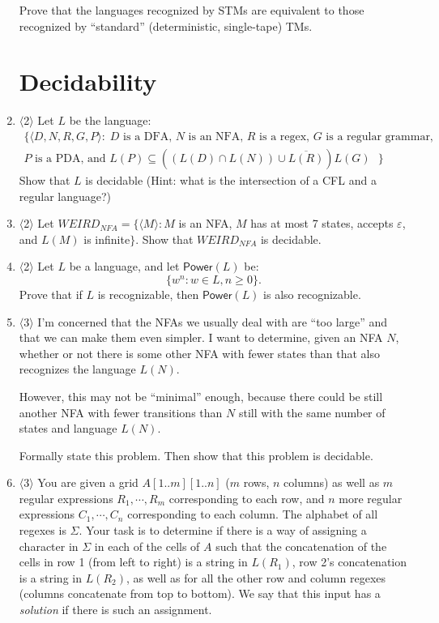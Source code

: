 \documentclass[a4paper,american,12pt]{book}
\newcommand{\Level}[1]{{\color{blue} $\langle$#1$\rangle$}}
\begin{document}
\begin{enumerate}
Prove that the languages recognized by STMs are equivalent to those recognized by ``standard'' (deterministic, single-tape) TMs.

\section{Decidability}

\item \Level{2} Let $L$ be the language:
\begin{align*}
\{ \langle D, N, R, G, P \rangle :\;\text{$D$ is a DFA, $N$ is an NFA, $R$ is a regex, $G$ is a regular grammar,}\\
\text{$P$ is a PDA, and $L(P) \subseteq ((L(D) \cap L(N)) \cup \overline{L(R)}) L(G)$ }   \}
\end{align*}
Show that $L$ is decidable (Hint: what is the intersection of a CFL and a regular language?)

\item \Level{2} Let $WEIRD_{NFA} = \{ \langle M \rangle : M$ is an NFA, $M$ has at most 7 states, accepts $\varepsilon$, and $L(M)$ is infinite$\}$.
Show that $WEIRD_{NFA}$ is decidable.

\item \Level{2} Let $L$ be a language, and let $\textsf{Power}(L)$ be:
\[
\{ w^n : w \in L, n \ge 0 \}.
\]
Prove that if $L$ is recognizable, then $\textsf{Power}(L)$ is also recognizable.

\item \Level{3} I'm concerned that the NFAs we usually deal with are ``too large'' and that we can make them even simpler. I want to determine, given an NFA $N$, whether or not there is some other NFA with fewer states than that also recognizes the language $L(N)$. 

However, this may not be ``minimal'' enough, because there could be still another NFA with fewer transitions than $N$ still with the same number of states and language $L(N)$. 

Formally state this problem. Then show that this problem is decidable.

\item \label{regex_crossword} \Level{3} You are given a grid $A[1..m][1..n]$ ($m$ rows, $n$ columns) as well as $m$ regular expressions $R_1, \cdots, R_m$ corresponding to each row, and $n$ more regular expressions $C_1, \cdots, C_n$ corresponding to each column. The alphabet of all regexes is $\Sigma$. Your task is to determine if there is a way of assigning a character in $\Sigma$ in each of the cells of $A$ such that the concatenation of the cells in row 1 (from left to right) is a string in $L(R_1)$, row 2's concatenation is a string in $L(R_2)$, as well as for all the other row and column regexes (columns concatenate from top to bottom). We say that this input has a \emph{solution} if there is such an assignment. 


\end{enumerate}
\end{document}
